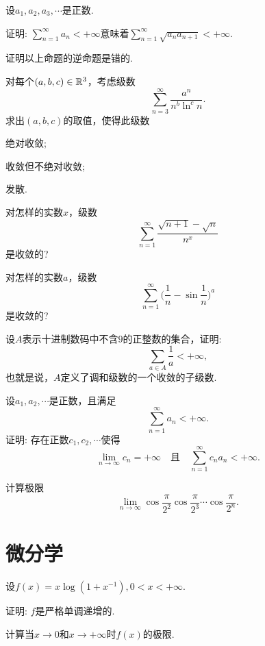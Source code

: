 \begin{example}
  设$a_1,a_2,a_3,\cdots$是正数.
  \begin{eenum}
    \item 证明: $\sum_{n=1}^\infty a_n<+\infty$意味着$\sum_{n=1}^\infty\sqrt{a_na_{n+1}}<+\infty$.
    \item 证明以上命题的逆命题是错的.
  \end{eenum}
\end{example}

\begin{example}
  对每个$(a,b,c)\in\mathbb R^3$，考虑级数
  \[ \sum_{n=3}^\infty\frac{a^n}{n^b\ln^cn}. \]
  求出$(a,b,c)$的取值，使得此级数
  \begin{eenum}
    \item 绝对收敛;
    \item 收敛但不绝对收敛;
    \item 发散.
  \end{eenum}
\end{example}

\begin{example}
  对怎样的实数$x$，级数
  \[ \sum_{n=1}^\infty\frac{\sqrt{n+1}-\sqrt n}{n^x} \]
  是收敛的?
\end{example}

\begin{example}
  对怎样的实数$a$，级数
  \[ \sum_{n=1}^\infty\Big(\frac1n-\sin\frac1n\Big)^a \]
  是收敛的?
\end{example}

\begin{example}
  设$A$表示十进制数码中不含$9$的正整数的集合，证明:
  \[ \sum_{a\in A}\frac1a<+\infty, \]
  也就是说，$A$定义了调和级数的一个收敛的子级数.
\end{example}

\begin{example}
  设$a_1,a_2,\cdots$是正数，且满足
  \[ \sum_{n=1}^\infty a_n<+\infty. \]
  证明: 存在正数$c_1,c_2,\cdots$使得
  \[ \lim_{n\to\infty}c_n=+\infty\quad\text{且}\quad
  \sum_{n=1}^\infty c_na_n<+\infty. \]
\end{example}

\begin{example}
  计算极限
  \[ \lim_{n\to\infty}\cos\frac\pi{2^2}\cos
  \frac\pi{2^3}\cdots\cos\frac\pi{2^n}. \]
\end{example}

\section{微分学}
\begin{example}
  设$f(x)=x\log(1+x^{-1}),0<x<+\infty$.
  \begin{eenum}
    \item 证明: $f$是严格单调递增的.
    \item 计算当$x\to0$和$x\to+\infty$时$f(x)$的极限.
  \end{eenum}
\end{example}

